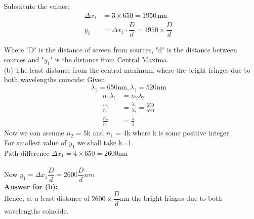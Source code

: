 \documentclass[journal,12pt,twocolumn]{IEEEtran}
\theoremstyle{remark}
\begin{document}
Substitute the values:
\begin{align}
\Delta x_1 &= 3\times650 = 1950 \, \text{nm} \\
y_1 &= \Delta x_1\cdot\dfrac{D}{d} = 1950\times\dfrac{D}{d}
\end{align}

Where "D" is the distance of screen from sources, "d" is the distance between sources and "$y_1$" is the distance from Central Maxima.\\
(b) The least distance from the central maximum where the bright fringes due to both wavelengths coincide:
Given \[\lambda_1 = 650 \text{nm} ,\lambda_1 = 520 \text{nm}\]
\begin{align}
  n_1 \lambda_1 &= n_2\lambda_2 \\
\frac{n_2}{n_1} &= \frac{\lambda_1}{\lambda_2} = \frac{650}{520}\\
\frac{n_2}{n_1} &= \frac{5}{4}
\end{align}
Now we can assume $n_2$ = 5k and $n_1$ = 4k where k is some positive integer.\\
For smallest value of $y_1$ we shall take k=1.\\
Path difference $\Delta x_1 = 4\times650 = 2600 \text{nm}$\\\\
Now $y_1 =\Delta x_1 \dfrac{D}{d} = 2600\dfrac{D}{d}nm $\\
\textbf{Answer for (b):}
\\
Hence, at a least distance of $2600\times\dfrac{D}{d}$nm the bright fringes due to  both wavelengths coincide.
\end{document}
